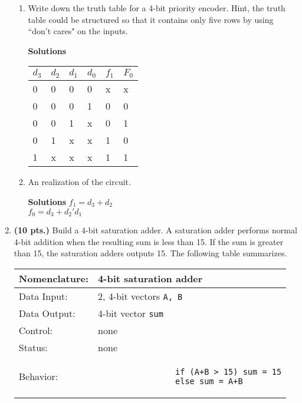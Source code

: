 \begin{enumerate}
\begin{enumerate}
\item Write down the truth table for a 4-bit priority encoder.  Hint, 
the truth table could be structured so that it contains only five rows
by using ``don't cares" on the inputs.

\begin{onlysolution} \textbf{Solutions} \itshape{
\begin{tabular}{l|l|l|l||l|l}
$d_3$ & $d_2$ & $d_1$ & $d_0$ & $f_1$ & $F_0$ \\ \hline
   0  &    0  &    0  &    0  &    x  &    x  \\ \hline
   0  &    0  &    0  &    1  &    0  &    0  \\ \hline
   0  &    0  &    1  &    x  &    0  &    1  \\ \hline
   0  &    1  &    x  &    x  &    1  &    0  \\ \hline
   1  &    x  &    x  &    x  &    1  &    1  \\
\end{tabular}
} \end{onlysolution} 

\item An \SOPmin realization of the circuit.
\begin{onlysolution} \textbf{Solutions} \itshape{
$f_1 = d_3 + d_2$ \\
$f_0 = d_3 + d_2'd_1$
}\end{onlysolution} 
\end{enumerate}

\item \textbf{ (10 pts.)} Build a 4-bit saturation adder.  A
saturation adder performs normal 4-bit addition when the 
resulting sum is less than 15.  If the sum is
greater than 15, the saturation adders outputs 15.  The
following table summarizes.

\label{page:saturation}
\begin{tabular}{|l|p{3.5in}|} \hline
Nomenclature:  & 4-bit saturation adder                \\ \hline
Data Input:    & 2, 4-bit vectors \verb+A, B+  \\ \hline
Data Output:   & 4-bit vector \verb+sum+    \\ \hline
Control:       & none                                   \\ \hline
Status:        & none                                   \\ \hline
Behavior:      & 
				\begin{verbatim}
				if (A+B > 15) sum = 15
				else sum = A+B
				\end{verbatim}
		 \\ \hline
\end{tabular}


\end{enumerate}
